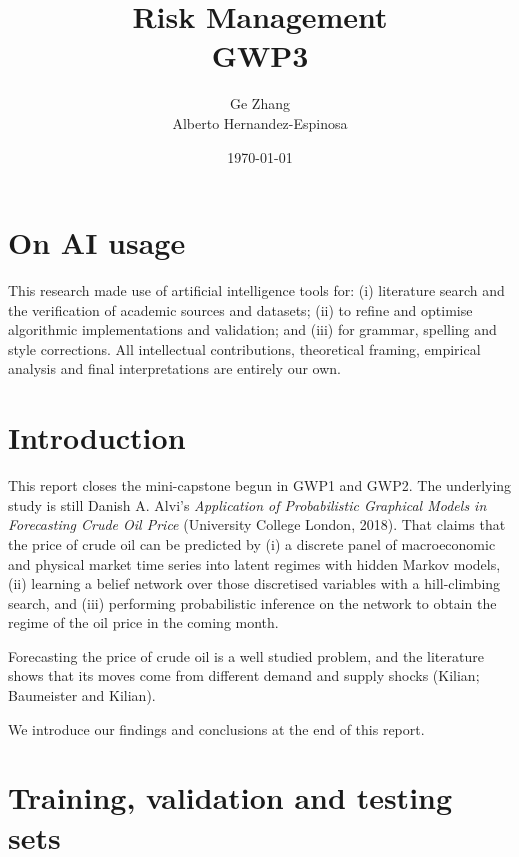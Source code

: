 \documentclass[11pt,a4paper]{article}
\title{Risk Management \\ GWP3\\[0.3em]}
\author{Ge Zhang \\ Alberto Hernandez-Espinosa}
\date{\today}
\begin{document}
\maketitle



\vspace{0.6em}

\section*{On AI usage}

This research made use of artificial intelligence tools for: (i) literature search and the 
verification of academic sources and datasets; (ii) to
refine and optimise algorithmic implementations and validation; and (iii) for grammar, 
spelling and style corrections. All intellectual contributions,
theoretical framing, empirical analysis and final interpretations are entirely our own.


\section{Introduction}

This report closes the mini-capstone begun in GWP1 and GWP2. The underlying study is still Danish A. 
Alvi's \textit{Application of Probabilistic Graphical Models in
Forecasting Crude Oil Price} (University College London, 2018). That claims that the price
of crude oil can be predicted by (i) a discrete panel of macroeconomic and physical market time
series into latent regimes with hidden Markov models, (ii) learning a belief network over those
discretised variables with a hill-climbing search, and (iii) performing probabilistic inference on
the network to obtain the regime of the oil price in the coming month.

Forecasting the price of crude oil is a well studied problem, and the literature shows that its
moves come from different demand and supply shocks (Kilian; Baumeister and Kilian).

We introduce our findings and conclusions at the end of this report.

\section{Training, validation and testing sets}
\end{document}
